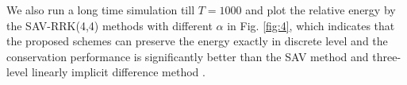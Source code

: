 \documentclass[preprint,compress,3p,10pt,fleqn]{elsarticle}
\numberwithin{equation}{section}
\begin{document}
We also run a long time simulation till $T=1000$ and plot the relative energy by the SAV-RRK(4,4) methods with different $\alpha$ in Fig. \ref{fig:4},
which indicates that the proposed schemes can preserve the energy exactly in discrete level and the conservation performance is significantly better
than the SAV method \cite{chengConvergenceEnergyconservingScheme2022} and three-level linearly implicit difference method \cite{wangConservativeLinearizedDifference2015}.
\begin{figure}[H]
\begin{center}
\\
\end{center}
\end{figure}
\end{document}
